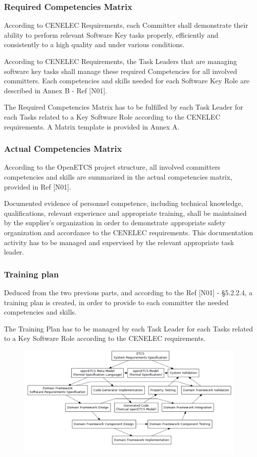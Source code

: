 \documentclass{template/openetcs_article}
\begin{document}
\subsubsection{Required Competencies Matrix}

According to CENELEC Requirements, each Committer shall demonstrate their ability to perform relevant Software Key tasks properly, efficiently and consistently to a high quality and under various conditions.

According to CENELEC Requirements, the Task Leaders that are managing software key tasks shall manage these required Competencies for all involved committers. Each competencies and skills needed for each Software Key Role are described in Annex B - Ref [N01].

The Required Competencies Matrix has to be fulfilled by each Task Leader for each Tasks related to a Key Software Role according to the CENELEC requirements. A Matrix template is provided in Annex A.


\subsubsection{Actual Competencies Matrix}
According to the OpenETCS project structure, all involved committers competencies and skills are summarized in the actual competencies matrix, provided in Ref [N01].

Documented evidence of personnel competence, including technical knowledge, qualifications, relevant experience and appropriate training, shall be maintained by the supplier's organization in order to demonstrate appropriate safety organization and accordance to the CENELEC requirements. This documentation activity has to be managed and supervised by the relevant appropriate task leader.


\subsubsection{Training plan}
Deduced from the two previous parts, and according to the Ref [N01] - {\S}5.2.2.4, a training plan is created, in order to provide to each committer the needed competencies and skills.

The Training Plan has to be managed by each Task Leader for each Tasks related to a Key Software Role according to the CENELEC requirements.

\begin{figure}
\includegraphics[width=\textwidth]{./figures/lifecycle3.PNG}
\end{figure}
\end{document}
